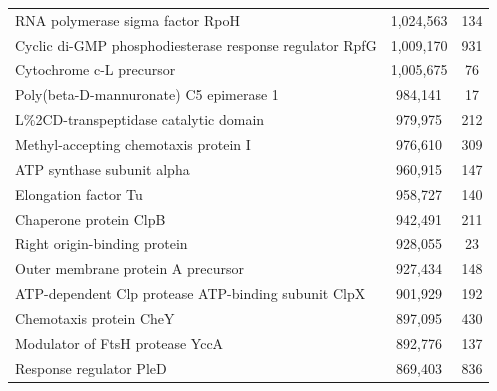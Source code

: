 \begin{singlespace}
\begin{longtable}{p{} cc}
                                                          RNA polymerase sigma factor RpoH &                   1,024,563 &           134 \\
                                   Cyclic di-GMP phosphodiesterase response regulator RpfG &                   1,009,170 &           931 \\
                                                                  Cytochrome c-L precursor &                   1,005,675 &            76 \\
                                                   Poly(beta-D-mannuronate) C5 epimerase 1 &                     984,141 &            17 \\
                                                     L\%2CD-transpeptidase catalytic domain &                     979,975 &           212 \\
                                                     Methyl-accepting chemotaxis protein I &                     976,610 &           309 \\
                                                                ATP synthase subunit alpha &                     960,915 &           147 \\
                                                                      Elongation factor Tu &                     958,727 &           140 \\
                                                                    Chaperone protein ClpB &                     942,491 &           211 \\
                                                              Right origin-binding protein &                     928,055 &            23 \\
                                                        Outer membrane protein A precursor &                     927,434 &           148 \\
                                       ATP-dependent Clp protease ATP-binding subunit ClpX &                     901,929 &           192 \\
                                                                   Chemotaxis protein CheY &                     897,095 &           430 \\
                                                           Modulator of FtsH protease YccA &                     892,776 &           137 \\
                                                                   Response regulator PleD &                     869,403 &           836 \\

\end{longtable}
\end{singlespace}
